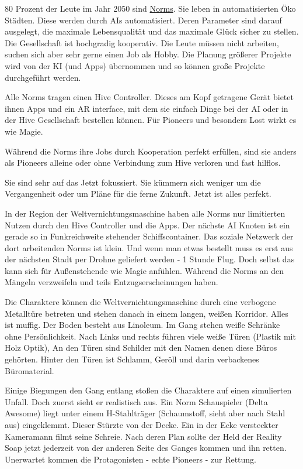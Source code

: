 \begin{sidebarBox}[title=Norms]

80 Prozent der Leute im Jahr 2050 sind \hyperref[sec:Norms]{Norms}. Sie leben in automatisierten Öko Städten. Diese werden durch  AIs automatisiert. Deren Parameter sind darauf ausgelegt, die maximale Lebensqualität und das maximale Glück sicher zu stellen. Die Gesellschaft ist hochgradig kooperativ. Die Leute müssen nicht arbeiten, suchen sich aber sehr gerne einen Job als Hobby. Die Planung größerer Projekte wird von der KI (und Apps) übernommen und so können große Projekte durchgeführt werden.

Alle Norms tragen einen Hive Controller. Dieses am Kopf getragene Gerät bietet ihnen Apps und ein AR interface, mit dem sie einfach Dinge bei der AI oder in der Hive Gesellschaft bestellen können. Für Pioneers und besonders Lost wirkt es wie Magie.

Während die Norms ihre Jobs durch Kooperation perfekt erfüllen, sind sie anders als Pioneers alleine oder ohne Verbindung zum Hive verloren und fast hilflos.

Sie sind sehr auf das Jetzt fokussiert. Sie kümmern sich weniger um die Vergangenheit oder um Pläne für die ferne Zukunft. Jetzt ist alles perfekt.

In der Region der Weltvernichtungsmaschine haben alle Norms nur limitierten Nutzen durch den Hive Controller und die Apps. Der nächste AI Knoten ist ein gerade so in Funkreichweite stehender Schiffscontainer. Das soziale Netzwerk der dort arbeitenden Norms ist klein. Und wenn man etwas bestellt muss es erst aus der nächsten Stadt per Drohne geliefert werden - 1 Stunde Flug. Doch selbst das kann sich für Außenstehende wie Magie anfühlen. Während die Norms an den Mängeln verzweifeln und teils Entzugserscheinungen haben.

\end{sidebarBox}

Die Charaktere können die Weltvernichtungsmaschine durch eine verbogene Metalltüre betreten und stehen danach in einem langen, weißen Korridor. Alles ist muffig. Der Boden besteht aus Linoleum. Im Gang stehen weiße Schränke ohne Persönlichkeit. Nach Links und rechts führen viele weiße Türen (Plastik mit Holz Optik), An den Türen sind Schilder mit den Namen denen diese Büros gehörten. Hinter den Türen ist Schlamm, Geröll und darin verbackenes Büromaterial.

Einige Biegungen den Gang entlang stoßen die Charaktere auf einen simulierten Unfall. Doch zuerst sieht er realistisch aus. Ein Norm Schauspieler (Delta Awesome) liegt unter einem H-Stahlträger (Schaumstoff, sieht aber nach Stahl aus) eingeklemmt. Dieser Stürzte von der Decke. Ein in der Ecke versteckter Kameramann filmt seine Schreie. Nach deren Plan sollte der Held der Reality Soap jetzt jederzeit von der anderen Seite des Ganges kommen und ihn retten. Unerwartet kommen die Protagonisten - echte Pioneers - zur Rettung.


